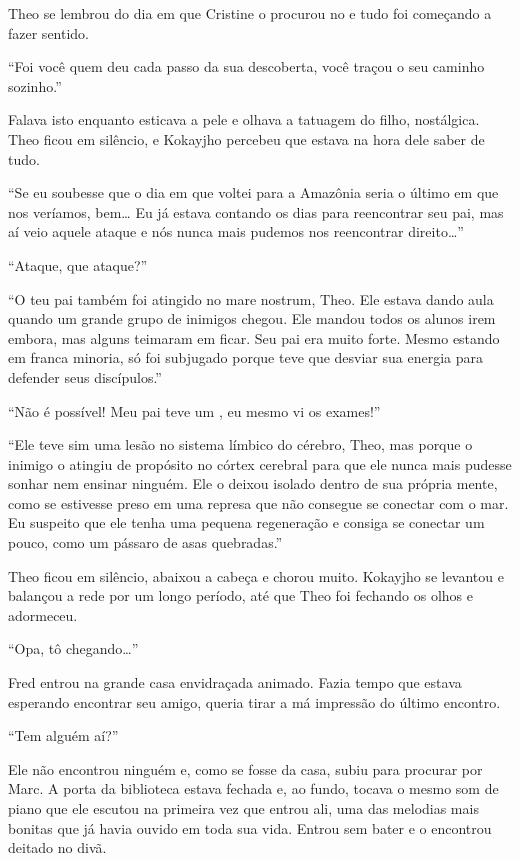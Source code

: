 Theo se lembrou do dia em que Cristine o procurou no  e tudo foi
começando a fazer sentido.

``Foi você quem deu cada passo da sua descoberta, você traçou o seu
caminho sozinho.''

Falava isto enquanto esticava a pele e olhava a tatuagem do filho,
nostálgica. Theo ficou em silêncio, e Kokayjho percebeu que estava na hora dele saber
de tudo.

``Se eu soubesse que o dia em que voltei para a Amazônia seria o último em
que nos veríamos, bem\ldots{} Eu já estava contando os dias para
reencontrar seu pai, mas aí veio aquele ataque e nós nunca mais pudemos
nos reencontrar direito\ldots{}''

``Ataque, que ataque?''

``O teu pai também foi atingido no mare nostrum, Theo. Ele estava dando
aula quando um grande grupo de inimigos chegou. Ele mandou todos os alunos irem embora, mas
alguns teimaram em ficar. Seu pai era muito
forte. Mesmo estando em franca minoria, só foi subjugado porque teve que
desviar sua energia para defender seus discípulos.''

``Não é possível! Meu pai teve um , eu mesmo vi os exames!''

``Ele teve sim uma lesão no sistema límbico do cérebro, Theo, mas porque
o inimigo o atingiu de propósito no córtex cerebral para que ele nunca
mais pudesse sonhar nem ensinar ninguém. Ele o deixou isolado dentro de
sua própria mente, como se estivesse preso em uma represa que não
consegue se conectar com o mar. Eu suspeito que ele tenha uma pequena
regeneração e consiga se conectar um pouco, como um pássaro de asas
quebradas.''

Theo ficou em silêncio, abaixou a cabeça e chorou muito. Kokayjho se
levantou e balançou a rede por um longo período, até que Theo foi fechando os
olhos e adormeceu.

\asterisc


``Opa, tô chegando\ldots{}''

Fred entrou na grande casa envidraçada animado. Fazia tempo que estava
esperando encontrar seu amigo, queria tirar a má impressão do último
encontro.

``Tem alguém aí?''

Ele não encontrou ninguém e, como se fosse da casa, subiu para procurar
por Marc. A porta da biblioteca estava fechada e, ao fundo, tocava o
mesmo som de piano que ele escutou na primeira vez que entrou ali, uma
das melodias mais bonitas que já havia ouvido em toda sua vida. Entrou
sem bater e o encontrou deitado no divã.

